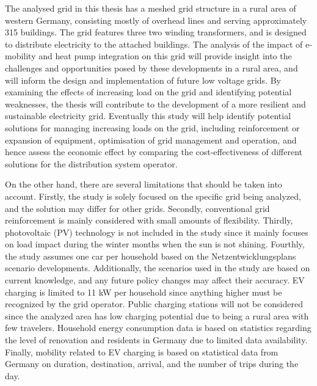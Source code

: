 The analysed grid in this thesis has a meshed grid structure in a rural area of western Germany, consisting mostly of overhead lines and serving approximately 315 buildings. The grid features three two winding transformers, and is designed to distribute electricity to the attached buildings. The analysis of the impact of e-mobility and heat pump integration on this grid will provide insight into the challenges and opportunities posed by these developments in a rural area, and will inform the design and implementation of future low voltage grids. By examining the effects of increasing load on the grid and identifying potential weaknesses, the thesis will contribute to the development of a more resilient and sustainable electricity grid. Eventually this study will help identify potential solutions for managing increasing loads on the grid, including reinforcement or expansion of equipment, optimisation of grid management and operation, and hence assess the economic effect by comparing the cost-effectiveness of different solutions for the distribution system operator. 

On the other hand, there are several limitations that should be taken into account. Firstly, the study is solely focused on the specific grid being analyzed, and the solution may differ for other grids. Secondly, conventional grid reinforcement is mainly considered with small amounts of flexibility. Thirdly, photovoltaic (PV) technology is not included in the study since it mainly focuses on load impact during the winter months when the sun is not shining. Fourthly, the study assumes one car per household based on the Netzentwicklungsplans scenario developments. Additionally, the scenarios used in the study are based on current knowledge, and any future policy changes may affect their accuracy. EV charging is limited to 11 kW per household since anything higher must be recognized by the grid operator. Public charging stations will not be considered since the analyzed area has low charging potential due to being a rural area with few travelers. Household energy consumption data is based on statistics regarding the level of renovation and residents in Germany due to limited data availability. Finally, mobility related to EV charging is based on statistical data from Germany on duration, destination, arrival, and the number of trips during the day.


